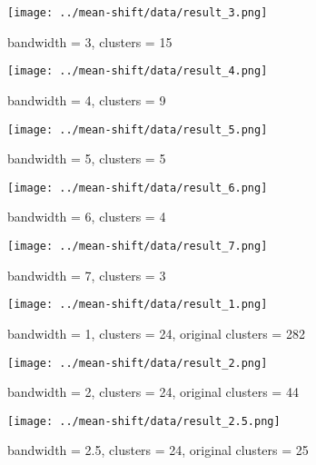 \documentclass{ETHExercise}
\begin{document}
\begin{figure}[!h]
    \texttt{[image: ../mean-shift/data/result\_3.png]}
    \caption{bandwidth = 3, clusters = 15}
  \endminipage\space
    \texttt{[image: ../mean-shift/data/result\_4.png]}
    \caption{bandwidth = 4, clusters = 9}
  \endminipage\space
    \texttt{[image: ../mean-shift/data/result\_5.png]}
    \caption{bandwidth = 5, clusters = 5}
  \endminipage\hfill
    \texttt{[image: ../mean-shift/data/result\_6.png]}
    \caption{bandwidth = 6, clusters = 4}
  \endminipage\hfill
    \texttt{[image: ../mean-shift/data/result\_7.png]}
    \caption{bandwidth = 7, clusters = 3}
  \endminipage\hfill
    \texttt{[image: ../mean-shift/data/result\_1.png]}
    \caption{bandwidth = 1, clusters = 24, original clusters = 282}
  \endminipage\hfill
    \texttt{[image: ../mean-shift/data/result\_2.png]}
    \caption{bandwidth = 2, clusters = 24, original clusters = 44}
  \endminipage\space\space\space\space\space\space\space\space
    \texttt{[image: ../mean-shift/data/result\_2.5.png]}
  \caption{bandwidth = 2.5, clusters = 24, original clusters = 25}
  \endminipage\space
  \end{figure}
\end{document}

